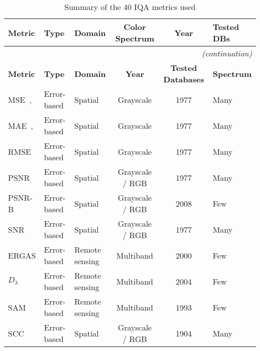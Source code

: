 \begin{longtable}{l l l c c l}
    \caption{Summary of the 40 IQA metrics used}\label{tab:fr_iqa_metrics}\\
    \hline %
    \textbf{Metric} & \textbf{Type} & \textbf{Domain} & \textbf{Color Spectrum} & \textbf{Year} & \textbf{Tested DBs}\\
    \hline %
    \endfirsthead %
    \multicolumn{6}{r}{\small\itshape(continuation)}\\ %
    \hline %
    \textbf{Metric} & \textbf{Type} & \textbf{Domain} & \textbf{Year} & \textbf{Tested Databases} & \textbf{Spectrum}\\
    \hline %
    \endhead %
    \hline %
    \endfoot %

    MSE~\cite{Gonzalez2008DIP}, & Error-based & Spatial        & Grayscale       & 1977 & Many \\
    MAE~\cite{Gonzalez2008DIP}, & Error-based & Spatial        & Grayscale       & 1977 & Many \\
    RMSE~\cite{Gonzalez2008DIP} & Error-based & Spatial        & Grayscale       & 1977 & Many \\
    PSNR~\cite{Gonzalez2008DIP} & Error-based & Spatial        & Grayscale / RGB & 1977 & Many \\
    PSNR-B & Error-based & Spatial        & Grayscale / RGB & 2008 & Few  \\
    SNR  & Error-based & Spatial        & Grayscale / RGB & 1977 & Many \\
    ERGAS & Error-based & Remote sensing & Multiband       & 2000 & Few  \\
    $D_{\lambda}$ & Error-based & Remote sensing & Multiband       & 2004 & Few  \\
    SAM & Error-based & Remote sensing & Multiband       & 1993 & Few  \\
    SCC & Error-based & Spatial        & Grayscale / RGB & 1904 & Many \\



\end{longtable}
